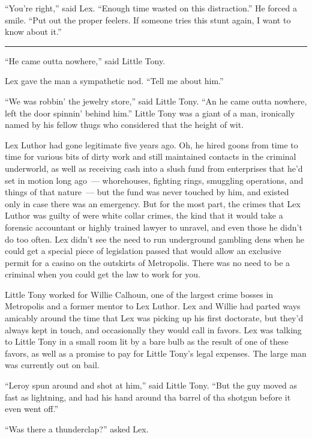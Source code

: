 \documentclass[ebook,12pt]{memoir}
\begin{document}
``You're right,'' said Lex. ``Enough time wasted on this distraction.''
He forced a smile. ``Put out the proper feelers. If someone tries this
stunt again, I want to know about it.''

\begin{center}\rule{0.5\linewidth}{0.5pt}\end{center}

``He came outta nowhere,'' said Little Tony.

Lex gave the man a sympathetic nod. ``Tell me about him.''

``We was robbin' the jewelry store,'' said Little Tony. ``An he came
outta nowhere, left the door spinnin' behind him.'' Little Tony was a
giant of a man, ironically named by his fellow thugs who considered that
the height of wit.

Lex Luthor had gone legitimate five years ago. Oh, he hired goons from
time to time for various bits of dirty work and still maintained
contacts in the criminal underworld, as well as receiving cash into a
slush fund from enterprises that he'd set in motion long ago~---
whorehouses, fighting rings, smuggling operations, and things of that
nature~--- but the fund was never touched by him, and existed only in
case there was an emergency. But for the most part, the crimes that Lex
Luthor was guilty of were white collar crimes, the kind that it would
take a forensic accountant or highly trained lawyer to unravel, and even
those he didn't do too often. Lex didn't see the need to run underground
gambling dens when he could get a special piece of legislation passed
that would allow an exclusive permit for a casino on the outskirts of
Metropolis. There was no need to be a criminal when you could get the
law to work for you.

Little Tony worked for Willie Calhoun, one of the largest crime bosses
in Metropolis and a former mentor to Lex Luthor. Lex and Willie had
parted ways amicably around the time that Lex was picking up his first
doctorate, but they'd always kept in touch, and occasionally they would
call in favors. Lex was talking to Little Tony in a small room lit by a
bare bulb as the result of one of these favors, as well as a promise to
pay for Little Tony's legal expenses. The large man was currently out on
bail.

``Leroy spun around and shot at him,'' said Little Tony. ``But the guy
moved as fast as lightning, and had his hand around tha barrel of tha
shotgun before it even went off.''

``Was there a thunderclap?'' asked Lex.
\end{document}
